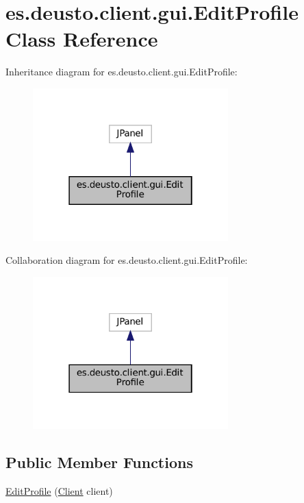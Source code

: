 \hypertarget{classes_1_1deusto_1_1client_1_1gui_1_1_edit_profile}{}\section{es.\+deusto.\+client.\+gui.\+Edit\+Profile Class Reference}
\label{classes_1_1deusto_1_1client_1_1gui_1_1_edit_profile}


Inheritance diagram for es.\+deusto.\+client.\+gui.\+Edit\+Profile\+:\nopagebreak
\begin{figure}[H]
\begin{center}
\leavevmode
\includegraphics[width=214pt]{classes_1_1deusto_1_1client_1_1gui_1_1_edit_profile__inherit__graph}
\end{center}
\end{figure}


Collaboration diagram for es.\+deusto.\+client.\+gui.\+Edit\+Profile\+:\nopagebreak
\begin{figure}[H]
\begin{center}
\leavevmode
\includegraphics[width=214pt]{classes_1_1deusto_1_1client_1_1gui_1_1_edit_profile__coll__graph}
\end{center}
\end{figure}
\subsection*{Public Member Functions}
\begin{DoxyCompactItemize}
\item 
\mbox{\hyperlink{classes_1_1deusto_1_1client_1_1gui_1_1_edit_profile_a0302d5f1a2df66b4e4ce357ec32015bd}{Edit\+Profile}} (\mbox{\hyperlink{classes_1_1deusto_1_1client_1_1_client}{Client}} client)
\end{DoxyCompactItemize}


